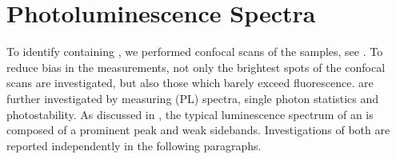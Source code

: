 
\section{Photoluminescence Spectra} \label{sec::spectra}

	To identify \nds containing \sivs, we performed confocal scans of the samples, see . 
	To reduce bias in the measurements, not only the brightest spots of the confocal scans are investigated, but also those which barely exceed \bkg fluorescence.
	\sivs are further investigated by measuring \pl (PL) spectra, single photon statistics and photostability.
	As discussed in , the typical luminescence spectrum of an \siv is composed of a prominent \zpl peak and weak sidebands.
	Investigations of both are reported independently in the following paragraphs.


